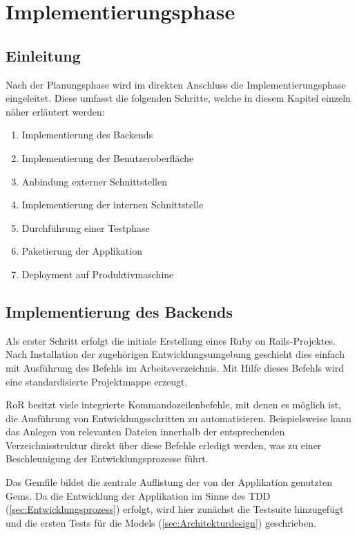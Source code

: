 
\section{Implementierungsphase}
\label{sec:Implementierungsphase}

\subsection{Einleitung}
\label{sec:Einleitung}
Nach der Planungsphase wird im direkten Anschluss die Implementierungsphase eingeleitet. Diese
umfasst die folgenden Schritte, welche in diesem Kapitel einzeln näher erläutert werden:
\begin{enumerate}
	\item Implementierung des Backends
	\item Implementierung der Benutzeroberfläche
	\item Anbindung externer Schnittstellen
	\item Implementierung der internen Schnittstelle
	\item Durchführung einer Testphase
	\item Paketierung der Applikation
	\item Deployment auf Produktivmaschine
\end{enumerate}

\subsection{Implementierung des Backends}
\label{sec:Implementierung des Backends}
Als erster Schritt erfolgt die initiale Erstellung eines Ruby on Rails-Projektes.
Nach Installation der zugehörigen Entwicklungsumgebung geschieht dies einfach mit Ausführung des
Befehls  im Arbeitsverzeichnis. Mit Hilfe dieses Befehls wird eine
standardisierte Projektmappe erzeugt.

RoR besitzt viele integrierte Kommandozeilenbefehle, mit denen es
möglich ist, die Ausführung von
Entwicklungsschritten zu automatisieren. Beispielsweise kann das Anlegen
von relevanten Dateien innerhalb der entsprechenden Verzeichnisstruktur
direkt über diese Befehle erledigt werden, was zu einer Beschleunigung
der Entwicklungsprozesse führt.

Das Gemfile bildet die zentrale Auflistung der von der Applikation genutzten Gems. Da die
Entwicklung der Applikation im Sinne des \acs{TDD} (\Vgl \ref{sec:Entwicklungsprozess}) erfolgt,
wird hier zunächst die Testsuite  hinzugefügt und die ersten Tests für die Models
(\Vgl \ref{sec:Architekturdesign}) geschrieben.

